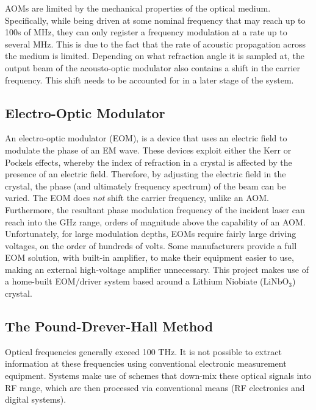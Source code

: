 AOMs are limited by the mechanical properties of the optical medium. Specifically, while being driven at some nominal frequency that may reach up to 100s of MHz, they can only register a frequency modulation at a rate up to several MHz. This is due to the fact that the rate of acoustic propagation across the medium is limited. Depending on what refraction angle it is sampled at, the output beam of the acousto-optic modulator also contains a shift in the carrier frequency.  This shift needs to be accounted for in a later stage of the system.

\subsection{Electro-Optic Modulator}

An electro-optic modulator (EOM), is a device that uses an electric field to modulate the phase of an EM wave.  These devices exploit either the Kerr or Pockels effects, whereby the index of refraction in a crystal is affected by the presence of an electric field.  Therefore, by adjusting the electric field in the crystal, the phase (and ultimately frequency spectrum) of the beam can be varied. The EOM does \emph{not} shift the carrier frequency, unlike an AOM. Furthermore, the resultant phase modulation frequency of the incident laser can reach into the GHz range, orders of magnitude above the
capability of an AOM.\\

Unfortunately, for large modulation depths, EOMs require fairly large driving voltages, on the order of hundreds of volts.  Some manufacturers provide a full EOM solution, with built-in amplifier, to make their equipment easier to use, making an external high-voltage amplifier unnecessary. This project makes use of a home-built EOM/driver system based around a Lithium Niobiate (LiNbO$_3$) crystal.

\subsection{The Pound-Drever-Hall Method}

Optical frequencies generally exceed 100 THz. It is not possible to extract information at these frequencies using conventional electronic measurement equipment. Systems make use of schemes that down-mix these optical signals into RF range, which are then processed via conventional means (RF electronics and digital systems). \\

